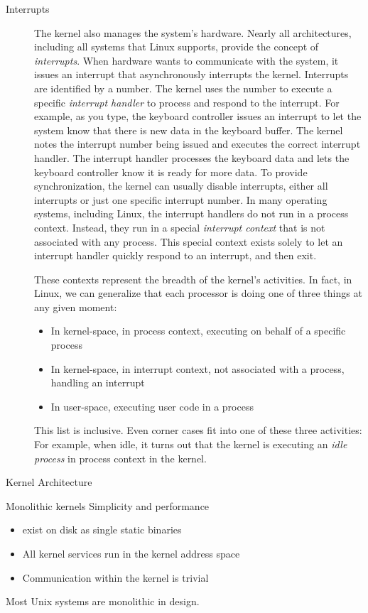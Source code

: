 \begin{description}
\item[Interrupts] The kernel also manages the system's hardware. Nearly all architectures,
  including all systems that Linux supports, provide the concept of
  \emph{interrupts}. When hardware wants to communicate with the system, it issues an
  interrupt that asynchronously interrupts the kernel. Interrupts are identified by a
  number. The kernel uses the number to execute a specific \emph{interrupt handler} to
  process and respond to the interrupt. For example, as you type, the keyboard controller
  issues an interrupt to let the system know that there is new data in the keyboard
  buffer. The kernel notes the interrupt number being issued and executes the correct
  interrupt handler. The interrupt handler processes the keyboard data and lets the
  keyboard controller know it is ready for more data. To provide synchronization, the
  kernel can usually disable interrupts, either all interrupts or just one specific
  interrupt number. In many operating systems, including Linux, the interrupt handlers do
  not run in a process context. Instead, they run in a special \emph{interrupt context}
  that is not associated with any process. This special context exists solely to let an
  interrupt handler quickly respond to an interrupt, and then exit.\cite{love2010linux}

  These contexts represent the breadth of the kernel's activities. In fact, in Linux, we
  can generalize that each processor is doing one of three things at any given moment:
  \begin{itemize}
  \item In kernel-space, in process context, executing on behalf of a specific process
  \item In kernel-space, in interrupt context, not associated with a process, handling an
    interrupt
  \item In user-space, executing user code in a process
  \end{itemize}
  This list is inclusive. Even corner cases fit into one of these three activities: For
  example, when idle, it turns out that the kernel is executing an \emph{idle process} in
  process context in the kernel.
\end{description}

\begin{frame}{Kernel Architecture}%
  \begin{exampleblock}{Monolithic kernels}
    Simplicity and performance
    \begin{itemize}
    \item exist on disk as single static binaries
    \item All kernel services run in the kernel address space
    \item Communication within the kernel is trivial
    \end{itemize}
    Most Unix systems are monolithic in design.
  \end{exampleblock}
\end{frame}

